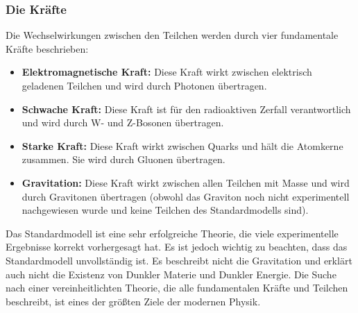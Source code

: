 \documentclass{article}
\begin{document}
\subsubsection{Die Kräfte}

Die Wechselwirkungen zwischen den Teilchen werden durch vier fundamentale Kräfte beschrieben:

\begin{itemize}
	\item \textbf{Elektromagnetische Kraft:} Diese Kraft wirkt zwischen elektrisch geladenen Teilchen und wird durch Photonen übertragen.
	\item \textbf{Schwache Kraft:} Diese Kraft ist für den radioaktiven Zerfall verantwortlich und wird durch W- und Z-Bosonen übertragen.
	\item \textbf{Starke Kraft:} Diese Kraft wirkt zwischen Quarks und hält die Atomkerne zusammen. Sie wird durch Gluonen übertragen.
	\item \textbf{Gravitation:} Diese Kraft wirkt zwischen allen Teilchen mit Masse und wird durch Gravitonen übertragen (obwohl das Graviton noch nicht experimentell nachgewiesen wurde und keine Teilchen des Standardmodells sind).
\end{itemize}

Das Standardmodell ist eine sehr erfolgreiche Theorie, die viele experimentelle Ergebnisse korrekt vorhergesagt hat. Es ist jedoch wichtig zu beachten, dass das Standardmodell unvollständig ist. Es beschreibt nicht die Gravitation und erklärt auch nicht die Existenz von Dunkler Materie und Dunkler Energie. Die Suche nach einer vereinheitlichten Theorie, die alle fundamentalen Kräfte und Teilchen beschreibt, ist eines der größten Ziele der modernen Physik.	
\end{document}
